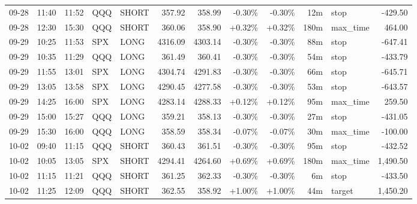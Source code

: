 \documentclass[11pt,a4paper,twoside]{article}
\begin{document}
\begin{center}
\begin{longtable}{>{\color{txtmain}}l l l l l r r r r r >{\color{txtmain}}l r}
09-28 & 11:40 & 11:52 & QQQ & SHORT & 357.92 & 358.99 & \textcolor{lossred}{-0.30\%} & \textcolor{lossred}{-0.30\%} & 12m & stop & \textcolor{lossred}{-429.50} \\
09-28 & 12:30 & 15:30 & QQQ & SHORT & 360.06 & 358.90 & \textcolor{wingreen}{+0.32\%} & \textcolor{wingreen}{+0.32\%} & 180m & max\_time & \textcolor{wingreen}{464.00} \\
09-29 & 10:25 & 11:53 & SPX & LONG & 4316.09 & 4303.14 & \textcolor{lossred}{-0.30\%} & \textcolor{lossred}{-0.30\%} & 88m & stop & \textcolor{lossred}{-647.41} \\
09-29 & 10:35 & 11:29 & QQQ & LONG & 361.49 & 360.41 & \textcolor{lossred}{-0.30\%} & \textcolor{lossred}{-0.30\%} & 54m & stop & \textcolor{lossred}{-433.79} \\
09-29 & 11:55 & 13:01 & SPX & LONG & 4304.74 & 4291.83 & \textcolor{lossred}{-0.30\%} & \textcolor{lossred}{-0.30\%} & 66m & stop & \textcolor{lossred}{-645.71} \\
09-29 & 13:05 & 13:58 & SPX & LONG & 4290.45 & 4277.58 & \textcolor{lossred}{-0.30\%} & \textcolor{lossred}{-0.30\%} & 53m & stop & \textcolor{lossred}{-643.57} \\
09-29 & 14:25 & 16:00 & SPX & LONG & 4283.14 & 4288.33 & \textcolor{wingreen}{+0.12\%} & \textcolor{wingreen}{+0.12\%} & 95m & max\_time & \textcolor{wingreen}{259.50} \\
09-29 & 15:00 & 15:27 & QQQ & LONG & 359.21 & 358.13 & \textcolor{lossred}{-0.30\%} & \textcolor{lossred}{-0.30\%} & 27m & stop & \textcolor{lossred}{-431.05} \\
09-29 & 15:30 & 16:00 & QQQ & LONG & 358.59 & 358.34 & \textcolor{lossred}{-0.07\%} & \textcolor{lossred}{-0.07\%} & 30m & max\_time & \textcolor{lossred}{-100.00} \\
10-02 & 09:40 & 11:15 & QQQ & SHORT & 360.43 & 361.51 & \textcolor{lossred}{-0.30\%} & \textcolor{lossred}{-0.30\%} & 95m & stop & \textcolor{lossred}{-432.52} \\
10-02 & 10:05 & 13:05 & SPX & SHORT & 4294.41 & 4264.60 & \textcolor{wingreen}{+0.69\%} & \textcolor{wingreen}{+0.69\%} & 180m & max\_time & \textcolor{wingreen}{1,490.50} \\
10-02 & 11:15 & 11:21 & QQQ & SHORT & 361.25 & 362.33 & \textcolor{lossred}{-0.30\%} & \textcolor{lossred}{-0.30\%} & 6m & stop & \textcolor{lossred}{-433.50} \\
10-02 & 11:25 & 12:09 & QQQ & SHORT & 362.55 & 358.92 & \textcolor{wingreen}{+1.00\%} & \textcolor{wingreen}{+1.00\%} & 44m & target & \textcolor{wingreen}{1,450.20} \\

\end{longtable}
\end{center}
\end{document}
